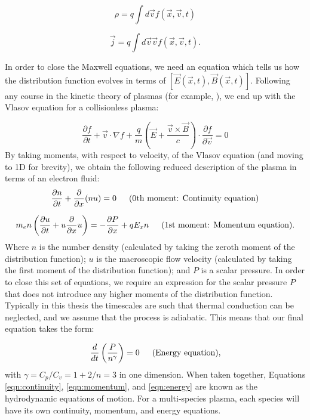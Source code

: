 \begin{equation}
\rho= q \int d \vec{v} f(\vec{x},\vec{v},t)
\end{equation}

\begin{equation}
\vec{j} = q \int d \vec{v} \vec{v} f(\vec{x},\vec{v},t).
\end{equation}

In order to close the Maxwell equations, we need an equation which tells us how the distribution function evolves in terms of $[\vec{E}(\vec{x},t),\vec{B}(\vec{x},t)]$. Following any course in the kinetic theory of plasmas (for example, \citet{MMathPhys}), we end up with the Vlasov equation for a collisionless plasma:

\begin{equation}
 	\frac{\partial f}{\partial t}+\vec{v} \cdot {\nabla} f+\frac{q}{m}\left(\vec{E}+\frac{\vec{v} \times \vec{B}}{c}\right) \cdot \frac{\partial f}{\partial \vec{v}}=0
\end{equation} By taking moments, with respect to velocity, of the Vlasov equation (and moving to 1D for brevity), we obtain the following reduced description of the plasma in terms of an electron fluid: 
\begin{equation}
\frac{\partial n}{\partial t}+\frac{\partial}{\partial x}(n u)=0 \text{\,\,\,\,\,\,\,\,\,(0th moment: Continuity equation)}
\label{eqn:continuity}
\end{equation}

\begin{equation}
m_e n \left(\frac{\partial u}{\partial t} + u\frac{\partial}{\partial x}u\right)=-\frac{\partial P}{\partial x}+q E_{x} n \text{\,\,\,\,\,\,\,\,\,(1st moment: Momentum equation)}.
\label{eqn:momentum}
\end{equation} Where $n$ is the number density (calculated by taking the zeroth moment of the distribution function); $u$ is the macroscopic flow velocity (calculated by taking the first moment of the distribution function); and $P$ is a scalar pressure. In order to close this set of equations, we require an expression for the scalar pressure $P$ that does not introduce any higher moments of the distribution function. Typically in this thesis the timescales are such that thermal conduction can be neglected, and we assume that the process is adiabatic. This means that our final equation takes the form:

\begin{equation}
\frac{d}{dt}\left(\frac{P}{n^{\gamma}}\right) = 0 \text{\,\,\,\,\,\,\,\,\,(Energy equation)},
\label{eqn:energy}
\end{equation} with $\gamma = C_p/C_v = 1 + 2/n = 3$ in one dimension. When taken together, Equations \ref{eqn:continuity}, \ref{eqn:momentum}, and \ref{eqn:energy} are known as the hydrodynamic equations of motion. For a multi-species plasma, each species will have its own continuity, momentum, and energy equations.

